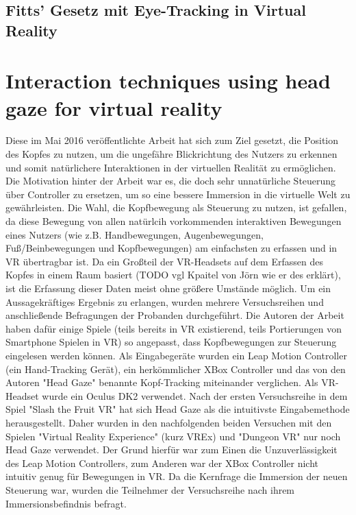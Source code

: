 \subsection{Fitts' Gesetz mit Eye-Tracking in Virtual Reality}

\section{Interaction techniques using head gaze for virtual reality}
\label{paper1}
Diese im Mai 2016 veröffentlichte Arbeit hat sich zum Ziel gesetzt, die Position des Kopfes zu nutzen, um die ungefähre Blickrichtung des Nutzers zu erkennen und somit natürlichere Interaktionen in der virtuellen Realität zu ermöglichen. Die Motivation hinter der Arbeit war es, die doch sehr unnatürliche Steuerung über Controller zu ersetzen, um so eine bessere Immersion in die virtuelle Welt zu gewährleisten. Die Wahl, die Kopfbewegung als Steuerung zu nutzen, ist gefallen, da diese Bewegung von allen natürlcih vorkommenden interaktiven Bewegungen eines Nutzers (wie z.B. Handbewegungen, Augenbewegungen, Fuß/Beinbewegungen und Kopfbewegungen) am einfachsten zu erfassen und in VR übertragbar ist. Da ein Großteil der VR-Headsets auf dem Erfassen des Kopfes in einem Raum basiert (TODO vgl Kpaitel von Jörn wie er des erklärt), ist die Erfassung dieser Daten meist ohne größere Umstände möglich. Um ein Aussagekräftiges Ergebnis zu erlangen, wurden mehrere Versuchsreihen und anschließende Befragungen der Probanden durchgeführt. Die Autoren der Arbeit haben dafür einige Spiele (teils bereits in VR existierend, teils Portierungen von Smartphone Spielen in VR) so angepasst, dass Kopfbewegungen zur Steuerung eingelesen werden können. Als Eingabegeräte wurden ein Leap Motion Controller (ein Hand-Tracking Gerät), ein herkömmlicher XBox Controller und das von den Autoren "Head Gaze" benannte Kopf-Tracking miteinander verglichen. Als VR-Headset wurde ein Oculus DK2 verwendet. 
Nach der ersten Versuchsreihe in dem Spiel "Slash the Fruit VR" hat sich Head Gaze als die intuitivste Eingabemethode herausgestellt. Daher wurden in den nachfolgenden beiden Versuchen mit den Spielen "Virtual Reality Experience" (kurz VREx) und "Dungeon VR" nur noch Head Gaze verwendet. Der Grund hierfür war zum Einen die Unzuverlässigkeit des Leap Motion Controllers, zum Anderen war der XBox Controller nicht intuitiv genug für Bewegungen in VR. 
Da die Kernfrage die Immersion der neuen Steuerung war, wurden die Teilnehmer der Versuchsreihe nach ihrem Immersionsbefindnis befragt.

